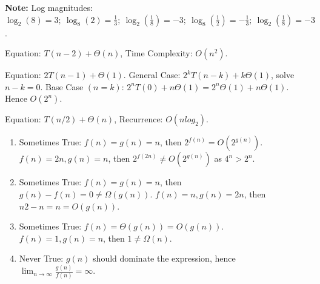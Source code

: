 \begin{Note}
    \textbf{Note:} Log magnitudes: $\log_2(8)=3;\ \log_8(2)=\frac{1}{3};\ \log_2(\frac{1}{8})=-3;\ \log_8(\frac{1}{2})=-\frac{1}{3};\ \log_2(\frac{1}{8})=-3$. 
\end{Note}

\begin{Answer} Equation: $T(n-2) + \Theta(n)$, Time Complexity: $O(n^2)$.
\end{Answer}

\vspace{.5em}
\begin{Answer} Equation: $2 T(n-1) + \Theta(1)$. General Case: $2^kT(n-k) + k\Theta(1)$, solve $n-k=0$.
    Base Case $(n=k)$: $2^n T(0) + n\Theta(1)=2^n \Theta(1) + n\Theta(1)$. Hence $O(2^n)$.
\end{Answer}

\vspace{.5em}
\begin{Answer} Equation: $T(n/2) + \Theta(n)$, Recurrence: $O(n log_2 )$. 
\end{Answer}

\vspace{.5em}
\begin{Answer}
    \begin{enumerate}
        \item Sometimes True: $f(n)=g(n)=n$, then $2^{f(n)} = O(2^{g(n)})$. $f(n)=2n, g(n)=n$, then $2^{f(2n)} \neq O(2^{g(n)})$ as $4^n > 2^n$.
        \item Sometimes True: $f(n)=g(n)=n$, then $g(n) - f(n) = 0 \neq \Omega(g(n))$. $f(n)=n, g(n)=2n$, then $n2 - n = n = O(g(n))$.
        \item Sometimes True: $f(n)=\Theta(g(n))=O(g(n))$. $f(n) = 1, g(n) = n$, then $1 \neq \Omega(n)$.
        \item Never True: $g(n)$ should dominate the expression, hence $\lim_{n \to \infty} \frac{g(n)}{f(n)} = \infty$.
    \end{enumerate}
\end{Answer}
    




